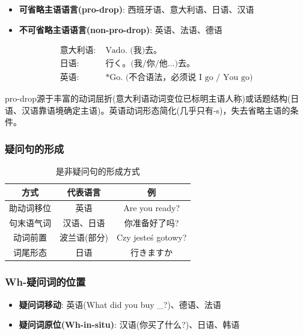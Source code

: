 \begin{itemize}
    \item \textbf{可省略主语语言(pro-drop)}: 西班牙语、意大利语、日语、汉语
    \item \textbf{不可省略主语语言(non-pro-drop)}: 英语、法语、德语
\end{itemize}

\begin{example}
\begin{align}
    \text{意大利语: } & \text{Vado. (我)去。} \\
    \text{日语: } & \text{行く。(我/你/他…)去。} \\
    \text{英语: } & \text{*Go. (不合语法，必须说 I go / You go)}
\end{align}
\end{example}

pro-drop源于丰富的动词屈折(意大利语动词变位已标明主语人称)或话题结构(日语、汉语靠语境确定主语)。英语动词形态简化(几乎只有-s)，失去省略主语的条件。

\subsubsection{疑问句的形成}

\begin{table}[H]
\centering
\caption{是非疑问句的形成方式}
\begin{tabulary}{\textwidth}{@{}CCC@{}}
\toprule
\textbf{方式} & \textbf{代表语言} & \textbf{例} \\
\midrule
助动词移位 & 英语 & Are you ready? \\
句末语气词 & 汉语、日语 & 你准备好了吗? \\
动词前置 & 波兰语(部分) & Czy jesteś gotowy? \\
词尾形态 & 日语 & 行きますか \\
\bottomrule
\end{tabulary}
\end{table}

\subsubsection{Wh-疑问词的位置}

\begin{itemize}
    \item \textbf{疑问词移动}: 英语(What did you buy \_?)、德语、法语
    \item \textbf{疑问词原位(Wh-in-situ)}: 汉语(你买了什么?)、日语、韩语
\end{itemize}


